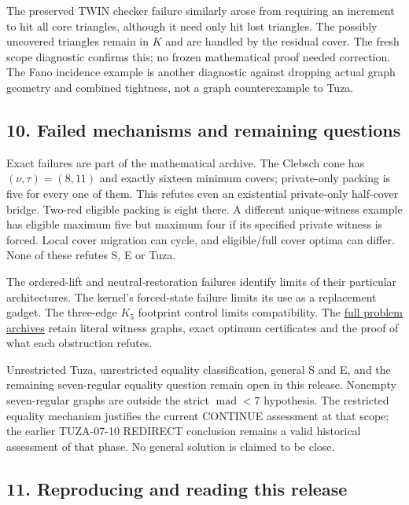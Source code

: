 \documentclass[11pt,a4paper]{article}
\begin{document}
The preserved TWIN checker failure similarly arose from requiring an increment to hit all core triangles, although it need only hit lost triangles. The possibly uncovered triangles remain in \(K\) and are handled by the residual cover. The fresh scope diagnostic confirms this; no frozen mathematical proof needed correction. The Fano incidence example is another diagnostic against dropping actual graph geometry and combined tightness, not a graph counterexample to Tuza.

\subsection{10. Failed mechanisms and remaining questions}\label{failed-mechanisms-and-remaining-questions}

Exact failures are part of the mathematical archive. The Clebsch cone has \((\nu,\tau)=(8,11)\) and exactly sixteen minimum covers; private-only packing is five for every one of them. This refutes even an existential private-only half-cover bridge. Two-red eligible packing is eight there. A different unique-witness example has eligible maximum five but maximum four if its specified private witness is forced. Local cover migration can cycle, and eligible/full cover optima can differ. None of these refutes S, E or Tuza.

The ordered-lift and neutral-restoration failures identify limits of their particular architectures. The kernel's forced-state failure limits its use as a replacement gadget. The three-edge \(K_5\) footprint control limits compatibility. The \href{https://github.com/pappa211/ai-math-experiments/blob/main/ORDINARY_PROOF_INDEX.md}{full problem archives} retain literal witness graphs, exact optimum certificates and the proof of what each obstruction refutes.

Unrestricted Tuza, unrestricted equality classification, general S and E, and the remaining seven-regular equality question remain open in this release. Nonempty seven-regular graphs are outside the strict \(\operatorname{mad}<7\) hypothesis. The restricted equality mechanism justifies the current CONTINUE assessment at that scope; the earlier TUZA-07-10 REDIRECT conclusion remains a valid historical assessment of that phase. No general solution is claimed to be close.

\subsection{11. Reproducing and reading this release}\label{reproducing-and-reading-this-release}
\end{document}
